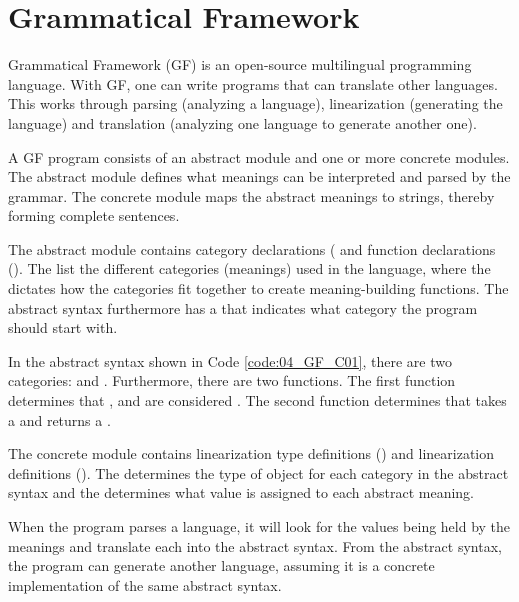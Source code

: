 \section{Grammatical Framework}
\label{04_GF}

Grammatical Framework (GF) is an open-source multilingual programming language. With GF, one can write programs that can translate other languages. This works through parsing (analyzing a language), linearization (generating the language) and translation (analyzing one language to generate another one).

A GF program consists of an abstract module and one or more concrete modules. The abstract module defines what meanings can be interpreted and parsed by the grammar. The concrete module maps the abstract meanings to strings, thereby forming complete sentences.

The abstract module contains category declarations ( and function declarations (). The  list the different categories (meanings) used in the language, where the  dictates how the categories fit together to create meaning-building functions. The abstract syntax furthermore has a  that indicates what category the program should start with. 


In the abstract syntax shown in Code \ref{code:04_GF_C01}, there are two categories:  and . Furthermore, there are two functions. The first function determines that ,  and  are considered . The second function determines that  takes a  and returns a .

The concrete module contains linearization type definitions () and linearization definitions
(). The  determines the type of object for each category in the abstract syntax and the  determines what value is assigned to each abstract meaning. 

When the program parses a language, it will look for the values being held by the meanings and translate each into the abstract syntax. From the abstract syntax, the program can generate another language, assuming it is a concrete implementation of the same abstract syntax.


